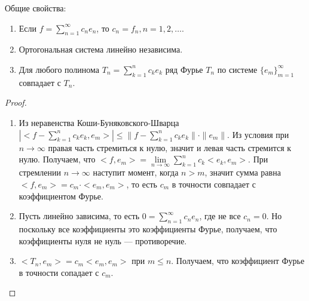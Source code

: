 Общие свойства:
\begin{enumerate}
	\item Если $f=\sum\limits_{n=1}^\infty c_n e_n$, то $c_n=f_n,n=1,2,\ldots$.
	\item Ортогональная система линейно независима.
	\item Для любого полинома $T_n=\sum\limits_{k=1}^n c_ke_k$ ряд Фурье $T_n$ по системе $\{e_m\}_{m=1}^\infty$ совпадает с $T_n$.
\end{enumerate}
\begin{proof}
\begin{enumerate}
	\item Из неравенства Коши-Буняковского-Шварца $\left|<f-\sum\limits_{k=1}^n c_ke_k,e_m>\right|\leqslant\|f-\sum\limits_{k=1}^n c_ke_k\|\cdot \|e_m\|$. Из условия при $n\to\infty$ правая часть стремиться к нулю, значит и левая часть стремится к нулю. Получаем, что $<f,e_m>=\lim\limits_{n\to\infty}\sum\limits_{k=1}^n c_k<e_k,e_m>$. При стремлении $n\to\infty$ наступит момент, когда $n>m$, значит сумма равна $<f,e_m>=c_m\cdot<e_m,e_m>$, то есть $c_m$ в точности совпадает с коэффициентом Фурье.
	\item Пусть линейно зависима, то есть $0=\sum\limits_{n=1}^\infty c_ne_n$, где не все $c_n=0$. Но поскольку все коэффициенты это коэффициенты Фурье, получаем, что коэффициенты нуля не нуль --- противоречие.
	\item $<T_n,e_m>=c_m<e_m,e_m>$ при $m\leqslant n$. Получаем, что коэффициент Фурье в точности сопадает с $c_m$.
\end{enumerate}
\end{proof}


























